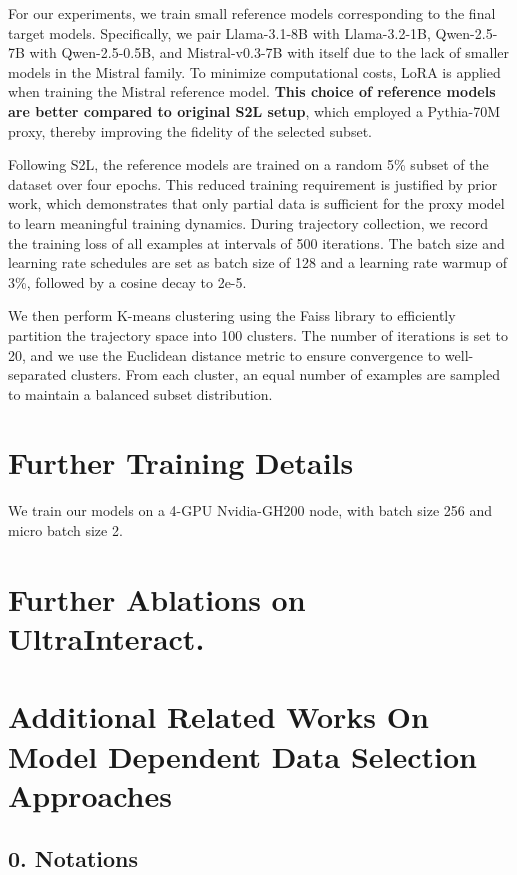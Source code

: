 For our experiments, we train small reference models corresponding to the final target models. Specifically, we pair Llama-3.1-8B with Llama-3.2-1B, Qwen-2.5-7B with Qwen-2.5-0.5B, and Mistral-v0.3-7B with itself due to the lack of smaller models in the Mistral family. To minimize computational costs, LoRA is applied when training the Mistral reference model. \textbf{This choice of reference models are better compared to original S2L setup}, which employed a Pythia-70M proxy, thereby improving the fidelity of the selected subset.

Following S2L, the reference models are trained on a random 5\% subset of the dataset over four epochs. This reduced training requirement is justified by prior work, which demonstrates that only partial data is sufficient for the proxy model to learn meaningful training dynamics. During trajectory collection, we record the training loss of all examples at intervals of 500 iterations. The batch size and learning rate schedules are set as batch size of 128 and a learning rate warmup of 3\%, followed by a cosine decay to 2e-5.

We then perform K-means clustering using the Faiss library to efficiently partition the trajectory space into 100 clusters. The number of iterations is set to 20, and we use the Euclidean distance metric to ensure convergence to well-separated clusters. From each cluster, an equal number of examples are sampled to maintain a balanced subset distribution.

\section{Further Training Details}

We train our models on a 4-GPU Nvidia-GH200 node, with batch size 256 and micro batch size 2. 

\section{Further Ablations on UltraInteract. }



\section{Additional Related Works On Model Dependent Data Selection Approaches}

\subsection{0. Notations}

